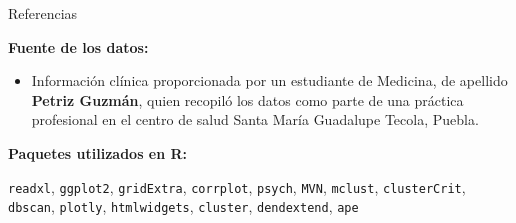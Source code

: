 \documentclass[
	11pt, %
]{beamer}
\begin{document}
\begin{frame}{Referencias}

\textbf{Fuente de los datos:}
\begin{itemize}
    \item Información clínica proporcionada por un estudiante de Medicina, de apellido \textbf{Petriz Guzmán}, quien recopiló los datos como parte de una práctica profesional en el centro de salud Santa María Guadalupe Tecola, Puebla.
\end{itemize}

\vspace{0.5cm}

\textbf{Paquetes utilizados en R:}

\smallskip

\texttt{readxl}, \texttt{ggplot2}, \texttt{gridExtra}, \texttt{corrplot}, \texttt{psych}, \texttt{MVN}, \texttt{mclust}, \texttt{clusterCrit}, \texttt{dbscan}, \texttt{plotly}, \texttt{htmlwidgets}, \texttt{cluster}, \texttt{dendextend}, \texttt{ape}

\end{frame}
\end{document}
